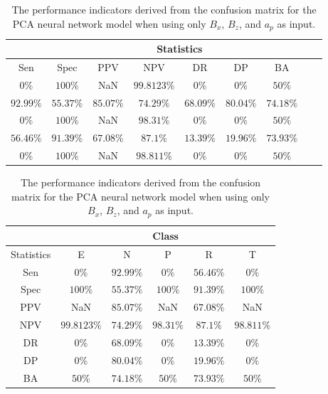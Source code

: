 \begin{table}[!ht]
	\centering
	\begin{tabular}{|c|c|c|c|c|c|c|c|c|}
		\hline
		 & \multicolumn{7}{c|}{Statistics} \\ \hline
		Sen & Spec & PPV & NPV & DR & DP & BA \\ \hline
		$0\%$ & $100\%$ & NaN & $99.8123\%$ & $0\%$ & $0\%$ & $50\%$ \\ \hline
		$92.99\%$ & $55.37\%$ & $85.07\%$ & $74.29\%$ & $68.09\%$ & $80.04\%$ & $74.18\%$ \\ \hline
		$0\%$ & $100\%$ & NaN & $98.31\%$ & $0\%$ & $0\%$ & $50\%$ \\ \hline
		$56.46\%$ & $91.39\%$ & $67.08\%$ & $87.1\%$ & $13.39\%$ & $19.96\%$ & $73.93\%$ \\ \hline
		$0\%$ & $100\%$ & NaN & $98.811\%$ & $0\%$ & $0\%$ & $50\%$ \\ \hline
	\end{tabular}
	\caption{The performance indicators derived from the confusion matrix for the PCA neural network model when using only $B_{x}$, $B_{z}$, and $a_{p}$ as input.}
	\label{tab:cs:xzap:pcaNNet}
\end{table}

\begin{table}[!ht]
	\centering
	\begin{tabular}{|c|c|c|c|c|c|}
		\hline
		 & \multicolumn{5}{c|}{Class} \\ \hline
		Statistics & E & N & P & R & T \\ \hline
		Sen & $0\%$ & $92.99\%$ & $0\%$ & $56.46\%$ & $0\%$ \\ \hline
		Spec & $100\%$ & $55.37\%$ & $100\%$ & $91.39\%$ & $100\%$ \\ \hline
		PPV & NaN & $85.07\%$ & NaN & $67.08\%$ & NaN \\ \hline
		NPV & $99.8123\%$ & $74.29\%$ & $98.31\%$ & $87.1\%$ & $98.811\%$ \\ \hline
		DR & $0\%$ & $68.09\%$ & $0\%$ & $13.39\%$ & $0\%$ \\ \hline
		DP & $0\%$ & $80.04\%$ & $0\%$ & $19.96\%$ & $0\%$ \\ \hline
		BA & $50\%$ & $74.18\%$ & $50\%$ & $73.93\%$ & $50\%$ \\ \hline
	\end{tabular}
	\caption{The performance indicators derived from the confusion matrix for the PCA neural network model when using only $B_{x}$, $B_{z}$, and $a_{p}$ as input.}
	\label{tab:cs:reverse:xzap:pcaNNet}
\end{table}

